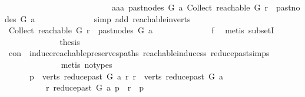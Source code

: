 \begin{isabellebody}
\ \ \ \ \ \ \ \ \ \ \ \ \ \ \ \ \ \ \ \ \ \ \ \ \ {\isasymor}\ aaa\ {\isacharparenleft}{\kern0pt}past{\isacharunderscore}{\kern0pt}nodes\ G\ a{\isacharparenright}{\kern0pt}\ {\isacharparenleft}{\kern0pt}Collect\ {\isacharparenleft}{\kern0pt}reachable\ G\ r{\isacharparenright}{\kern0pt}{\isacharparenright}{\kern0pt}\ {\isasymin}\ past{\isacharunderscore}{\kern0pt}nodes\ G\ a{\isachardoublequoteclose}\isanewline
\ \ \ \ \ \ \ \ \ \ \ \ \isamarkupfalse%
\ {\isacharparenleft}{\kern0pt}simp\ add{\isacharcolon}{\kern0pt}\ reachable{\isacharunderscore}{\kern0pt}in{\isacharunderscore}{\kern0pt}verts{\isacharparenleft}{\kern0pt}{}{\isacharparenright}{\kern0pt}{\isacharparenright}{\kern0pt}\isanewline
\ \ \ \ \ \ \ \ \ \ \isamarkupfalse%
\ \isamarkupfalse%
\ {\isachardoublequoteopen}Collect\ {\isacharparenleft}{\kern0pt}reachable\ G\ r{\isacharparenright}{\kern0pt}\ {\isasymsubseteq}\ past{\isacharunderscore}{\kern0pt}nodes\ G\ a{\isachardoublequoteclose}\isanewline
\ \ \ \ \ \ \ \ \ \ \ \ \isamarkupfalse%
\ f{}\ \isamarkupfalse%
\ {\isacharparenleft}{\kern0pt}metis\ subsetI{\isacharparenright}{\kern0pt}\isanewline
\ \ \ \ \ \ \ \ \ \ \isamarkupfalse%
\ \isamarkupfalse%
\ {\isacharquery}{\kern0pt}thesis\isanewline
\ \ \ \ \ \ \ \ \ \ \ \ \isamarkupfalse%
\ con\ \ induce{\isacharunderscore}{\kern0pt}reachable{\isacharunderscore}{\kern0pt}preserves{\isacharunderscore}{\kern0pt}paths\ reachable{\isacharunderscore}{\kern0pt}induce{\isacharunderscore}{\kern0pt}ss\ reduce{\isacharunderscore}{\kern0pt}past{\isachardot}{\kern0pt}simps\isanewline
\ \ \ \ \ \ \ \ \ \ \ \ \isamarkupfalse%
\ {\isacharparenleft}{\kern0pt}metis\ {\isacharparenleft}{\kern0pt}no{\isacharunderscore}{\kern0pt}types{\isacharparenright}{\kern0pt}{\isacharparenright}{\kern0pt}\isanewline
\ \ \ \ \ \ \ \ \isamarkupfalse%
\isanewline
\ \ \ \ \ \ \isamarkupfalse%
\isanewline
\ \ \ \ \isamarkupfalse%
\isanewline
\ \ \ \ \isamarkupfalse%
\ \isanewline
\ \ \ \ \ \ {\isachardoublequoteopen}{\isasymexists}p\ {\isasymin}\ verts\ {\isacharparenleft}{\kern0pt}reduce{\isacharunderscore}{\kern0pt}past\ G\ a{\isacharparenright}{\kern0pt}{\isachardot}{\kern0pt}\ {\isacharparenleft}{\kern0pt}{\isasymforall}r{\isachardot}{\kern0pt}\ r\ {\isasymin}\ verts\ {\isacharparenleft}{\kern0pt}reduce{\isacharunderscore}{\kern0pt}past\ G\ a{\isacharparenright}{\kern0pt}\isanewline
\ \ \ \ \ \ \ \ \ {\isasymlongrightarrow}\ {\isacharparenleft}{\kern0pt}r\ {\isasymrightarrow}\isactrlsup {\isacharplus}{\kern0pt}\isactrlbsub reduce{\isacharunderscore}{\kern0pt}past\ G\ a\isactrlesub \ p\ {\isasymor}\ r\ {\isacharequal}{\kern0pt}\ p{\isacharparenright}{\kern0pt}{\isacharparenright}{\kern0pt}{\isachardoublequoteclose}\isanewline

\end{isabellebody}
